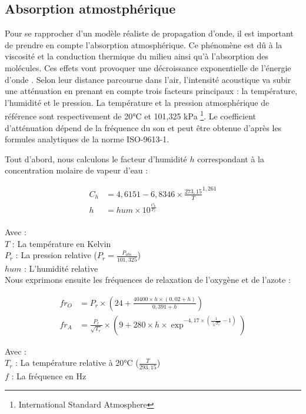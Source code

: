 \subsection{Absorption atmostphérique}
 \label{sect_absAIr}
Pour se rapprocher d'un modèle réaliste de propagation d'onde, il est important de prendre en compte l'absorption atmosphérique. Ce phénomène est dû à la viscosité et la conduction thermique du milieu ainsi qu'à l'absorption des molécules. Ces effets vont provoquer une décroissance exponentielle de l'énergie d'onde \cite[p. 68-70]{jouhaneau}. Selon leur distance parcourue dans l'air, l'intensité acoustique va subir une atténuation en prenant en compte trois facteurs principaux : la température, l'humidité et le pression. La température et la pression atmosphérique de référence sont respectivement de 20°C et 101,325 kPa \footnote{International Standard Atmosphere}. Le coefficient d'atténuation dépend de la fréquence du son et peut être obtenue d'après les formules analytiques de la norme ISO-9613-1. 

Tout d'abord, nous calculons le facteur d'humidité $h$ correspondant à la concentration molaire de vapeur d'eau \cite[Annexe B, B.1]{iso} :

\begin{align}
	C_h & = 4,6151 - 6,8346 \times \frac{273,15}{T}^{1,261} \\
	h & = hum \times 10^{\frac{C_h}{P_r}} \\ 
\end{align}

Avec : \\
$T$ : La température en Kelvin \\
$P_r$ : La pression relative ($P_r = \frac{P_{abs}}{101,325}$) \\
$hum$ : L'humidité relative \\

Nous exprimons ensuite les fréquences de relaxation de l'oxygène et de l'azote \cite[6.2, eq. 3 et 4]{iso}:

\begin{align}
	fr_O & =  P_r \times (24 + \frac{40400 \times h \times (0,02 + h)}{0,391 + h})  \\
	fr_A & =  \frac{P_r}{\sqrt{T_r}} \times (9 + 280 \times h \times \exp^{-4,17 \times (\frac{1}{\sqrt[3]{T_r}} - 1)})
\end{align}


Avec : \\
$T_r$ : La température relative à 20°C ($\frac{T}{293,15}$) \\
$f$ : La fréquence en Hz \\

